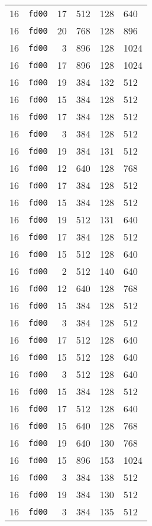 \documentclass{article}
\begin{document}
\begin{table}[h!]
\begin{tabular}{llrrrl}
    16 & \texttt{fd00} & 17 & 512 & 128 & 640 \\
    16 & \texttt{fd00} & 20 & 768 & 128 & 896 \\
    16 & \texttt{fd00} & 3 & 896 & 128 & 1024 \\
    16 & \texttt{fd00} & 17 & 896 & 128 & 1024 \\
    16 & \texttt{fd00} & 19 & 384 & 132 & 512 \\
    16 & \texttt{fd00} & 15 & 384 & 128 & 512 \\
    16 & \texttt{fd00} & 17 & 384 & 128 & 512 \\
    16 & \texttt{fd00} & 3 & 384 & 128 & 512 \\
    16 & \texttt{fd00} & 19 & 384 & 131 & 512 \\
    16 & \texttt{fd00} & 12 & 640 & 128 & 768 \\
    16 & \texttt{fd00} & 17 & 384 & 128 & 512 \\
    16 & \texttt{fd00} & 15 & 384 & 128 & 512 \\
    16 & \texttt{fd00} & 19 & 512 & 131 & 640 \\
    16 & \texttt{fd00} & 17 & 384 & 128 & 512 \\
    16 & \texttt{fd00} & 15 & 512 & 128 & 640 \\
    16 & \texttt{fd00} & 2 & 512 & 140 & 640 \\
    16 & \texttt{fd00} & 12 & 640 & 128 & 768 \\
    16 & \texttt{fd00} & 15 & 384 & 128 & 512 \\
    16 & \texttt{fd00} & 3 & 384 & 128 & 512 \\
    16 & \texttt{fd00} & 17 & 512 & 128 & 640 \\
    16 & \texttt{fd00} & 15 & 512 & 128 & 640 \\
    16 & \texttt{fd00} & 3 & 512 & 128 & 640 \\
    16 & \texttt{fd00} & 15 & 384 & 128 & 512 \\
    16 & \texttt{fd00} & 17 & 512 & 128 & 640 \\
    16 & \texttt{fd00} & 15 & 640 & 128 & 768 \\
    16 & \texttt{fd00} & 19 & 640 & 130 & 768 \\
    16 & \texttt{fd00} & 15 & 896 & 153 & 1024 \\
    16 & \texttt{fd00} & 3 & 384 & 138 & 512 \\
    16 & \texttt{fd00} & 19 & 384 & 130 & 512 \\
    16 & \texttt{fd00} & 3 & 384 & 135 & 512 \\

\end{tabular}
\end{table}
\end{document}
